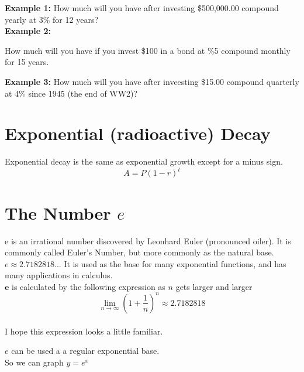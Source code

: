 \documentclass[12pt]{article}
\begin{document}
\hrulefill

\textbf{Example 1:}
How much will you have after investing \$500,000.00 compound yearly at 3\% for 12 years?\\


\vspace{1in}
\textbf{Example 2:}

How much will you have if you invest \$100 in a bond at \%5 compound monthly for 15 years.\\

\vspace{1in}

\textbf{Example 3:}
How much will you have after inveesting \$15.00 compound quarterly at 4\% since 1945 (the end of WW2)?\\

\pagebreak

\section*{Exponential (radioactive) Decay}

Exponential decay is the same as exponential growth except for a minus sign.\\

$$A=P(1-r)^t$$

\section*{The Number $e$}


e is an irrational number discovered by Leonhard Euler (pronounced oiler). It is commonly called Euler’s Number, but more commonly as the natural base. $e\approx 2.7182818...$ It is used as the base for many exponential functions, and has many applications in calculus.\\

$\mathbf{e}$ is calculated by the following expression as $n$ gets larger and larger $$\lim_{n \to \infty} \left(1+\frac{1}{n}\right)^n \approx 2.7182818$$\\

I hope this expression looks a little familiar.

\hrulefill

$e$ can be used a a regular exponential base. \\

So we can graph $y=e^x$\\

\begin{center}
\end{center}
\end{document}
